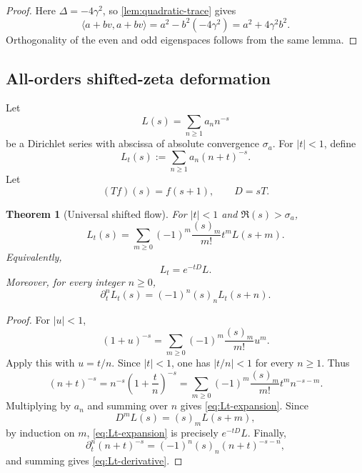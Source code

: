 \documentclass[11pt]{article}
\newcommand{\1}{\mathbf 1}
\newtheorem{theorem}{Theorem}[section]
\numberwithin{equation}{section}
\begin{document}
\begin{proof}
Here $\Delta=-4\gamma^2$, so \cref{lem:quadratic-trace} gives
\begin{equation}
  \langle a+bv,a+bv\rangle=a^2-b^2(-4\gamma^2)=a^2+4\gamma^2b^2.
\end{equation}
Orthogonality of the even and odd eigenspaces follows from the same lemma.
\end{proof}

\subsection{All-orders shifted-zeta deformation}

Let
\begin{equation}
  L(s)=\sum_{n\ge1}a_n n^{-s}
\end{equation}
be a Dirichlet series with abscissa of absolute convergence $\sigma_a$.  For $|t|<1$, define
\begin{equation}
  L_t(s):=\sum_{n\ge1}a_n(n+t)^{-s}.
\end{equation}
Let
\begin{equation}
  (Tf)(s)=f(s+1),
  \qquad
  D=sT.
\end{equation}

\begin{theorem}[Universal shifted flow]\label{thm:shifted-flow}
For $|t|<1$ and $\Re(s)>\sigma_a$,
\begin{equation}\label{eq:Lt-expansion}
  L_t(s)=\sum_{m\ge0}(-1)^m\frac{(s)_m}{m!}t^m L(s+m).
\end{equation}
Equivalently,
\begin{equation}
  L_t=e^{-tD}L.
\end{equation}
Moreover, for every integer $n\ge0$,
\begin{equation}\label{eq:Lt-derivative}
  \partial_t^n L_t(s)=(-1)^n(s)_n L_t(s+n).
\end{equation}
\end{theorem}

\begin{proof}
For $|u|<1$,
\begin{equation}
  (1+u)^{-s}=\sum_{m\ge0}(-1)^m\frac{(s)_m}{m!}u^m.
\end{equation}
Apply this with $u=t/n$.  Since $|t|<1$, one has $|t/n|<1$ for every $n\ge1$.  Thus
\begin{equation}
  (n+t)^{-s}=n^{-s}\left(1+\frac tn\right)^{-s}
  =\sum_{m\ge0}(-1)^m\frac{(s)_m}{m!}t^m n^{-s-m}.
\end{equation}
Multiplying by $a_n$ and summing over $n$ gives \eqref{eq:Lt-expansion}.  Since
\begin{equation}
  D^mL(s)=(s)_mL(s+m),
\end{equation}
by induction on $m$, \eqref{eq:Lt-expansion} is precisely $e^{-tD}L$.  Finally,
\begin{equation}
  \partial_t^n(n+t)^{-s}=(-1)^n(s)_n(n+t)^{-s-n},
\end{equation}
and summing gives \eqref{eq:Lt-derivative}.
\end{proof}
\end{document}
